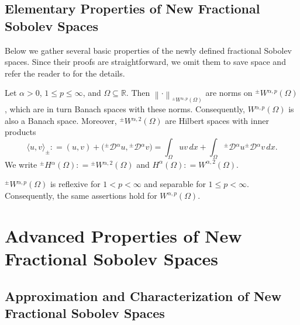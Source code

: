 \documentclass[leqno,final]{siamltex}
\numberwithin{equation}{section}
\renewcommand{\(}{\bigl(}
\renewcommand{\)}{\bigr)}
\newcommand{\R}{\mathbb{R}}
\begin{document}
\subsection{Elementary Properties of New Fractional Sobolev Spaces}\label{sec-3.2}
  Below we gather several basic properties of the newly defined fractional Sobolev spaces. Since
  their proofs are straightforward, we omit them to save space and refer the reader to
  \cite[Section 4]{Feng_Sutton} for the details. 
    
     \begin{proposition}
        Let $ \alpha >0$, $1 \leq p \leq \infty$, and $\Omega \subseteq \R$. Then $\left\| \cdot \right\|_{{^{\pm}}{W}{^{\alpha , p}}(\Omega)}$ are  norms  on ${^{\pm}}{W}{^{\alpha , p}}(\Omega)$,  which are in turn Banach spaces with these norms. Consequently, 
        $W{^{\alpha , p}(\Omega)}$ is also a Banach space.  Moreover,  ${^{\pm}}{W}{^{\alpha ,2}}(\Omega)$ are Hilbert spaces with inner products 
         \[ 
        \langle u,v \rangle_\pm : =(u,v) + \bigl( {^{\pm}}{\mathcal{D}}{^{\alpha}} u , {^{\pm}}{\mathcal{D}}{^{\alpha}}v \bigr)
        = \int_{\Omega} uv\,dx + \int_{\Omega} {^{\pm}}{\mathcal{D}}{^{\alpha}} u {^{\pm}}{\mathcal{D}}{^{\alpha}}v\,dx. 
        \]
        We write ${^{\pm}}{H}{^{\alpha}}(\Omega) : = {^{\pm}}{W}{^{\alpha,2}}(\Omega)$   
        and $ {H}^{\alpha}(\Omega): =  {W}^{\alpha,2}(\Omega)$.
    \end{proposition}
 
     
    \begin{proposition} ${^{\pm}}{W}{^{\alpha,p}}(\Omega)$ is reflexive for $1 < p < \infty$ and separable for $1 \leq p < \infty$. Consequently, the same assertions hold for $ {W}^{\alpha,p}(\Omega)$.
    \end{proposition}
 
    
\section{Advanced Properties of New Fractional Sobolev Spaces}\label{sec-4}

\subsection{Approximation and Characterization of New Fractional Sobolev Spaces}\label{sec-4.1}
    
\end{document}
